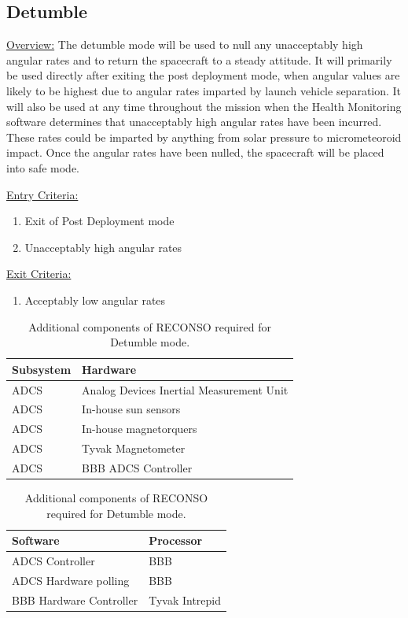 \documentclass{article}
\begin{document}
\newpage

\subsection{Detumble}

\underline{Overview:} The detumble mode will be used to null any unacceptably high angular rates and to return the spacecraft to a steady attitude. It will primarily be used directly after exiting the post deployment mode, when angular values are likely to be highest due to angular rates imparted by launch vehicle separation. It will also be used at any time throughout the mission when the Health Monitoring software determines that unacceptably high angular rates have been incurred. These rates could be imparted by anything from solar pressure to micrometeoroid impact. Once the angular rates have been nulled, the spacecraft will be placed into safe mode.

\underline{Entry Criteria:} 

\begin{enumerate}
\item Exit of Post Deployment mode
\item Unacceptably high angular rates
\end{enumerate}

\underline{Exit Criteria:}

\begin{enumerate}
\item Acceptably low angular rates
\end{enumerate}

\begin{table}[h!]
\caption{Additional components of RECONSO required for Detumble mode.}
\begin{adjustbox}{center}
\begin{tabular}{|l|l|}
\hline
Subsystem & Hardware \\ \hline \hline
ADCS & Analog Devices Inertial Measurement Unit  \\ \hline
ADCS & In-house sun sensors  \\ \hline
ADCS & In-house magnetorquers  \\ \hline
ADCS & Tyvak Magnetometer \\ \hline
ADCS & BBB ADCS Controller \\ \hline
\end{tabular}

\quad

\begin{tabular}{|l|l|}
\hline
Software & Processor \\ \hline \hline
ADCS Controller & BBB \\ \hline
ADCS Hardware polling & BBB \\ \hline \hline
BBB Hardware Controller & Tyvak Intrepid \\ \hline
\end{tabular}
\end{adjustbox}
\end{table}
\end{document}

